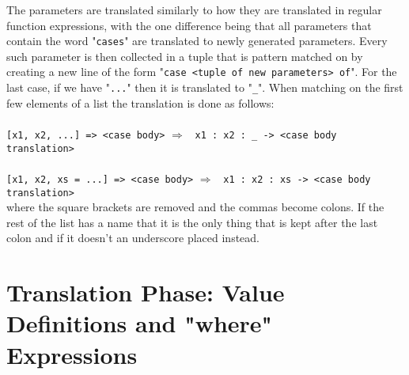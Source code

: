 \documentclass[diploma]{softlab-thesis}
\def\lra{$\Longrightarrow$\ }
\begin{document}
\begin{itemize}
The parameters are translated similarly to how they are translated in regular
function expressions, with the one difference being that all parameters that
contain the word "\texttt{cases}" are translated to newly generated parameters.
Every such parameter is then collected in a tuple that is pattern matched on by
creating a new line of the form "\verb|case <tuple of new parameters> of|". For
the last case, if we have "\verb|...|" then it is translated to "\verb|_|".
When matching on the first few elements of a list the translation is done as
follows:
\\\\
\verb|[x1, x2, ...] => <case body>|
\lra
\verb|x1 : x2 : _ -> <case body translation>|
\\\\
\verb|[x1, x2, xs = ...] => <case body>|
\lra
\verb|x1 : x2 : xs -> <case body translation>|
\\

where the square brackets are removed and the commas become colons.
If the rest of the list has a name that it is the only thing that is kept
after the last colon and if it doesn't an underscore placed instead.
\end{itemize}

\newpage
\section{Translation Phase: Value Definitions and "where" Expressions}
\label{subsec:tranvalwhere}
\end{document}
